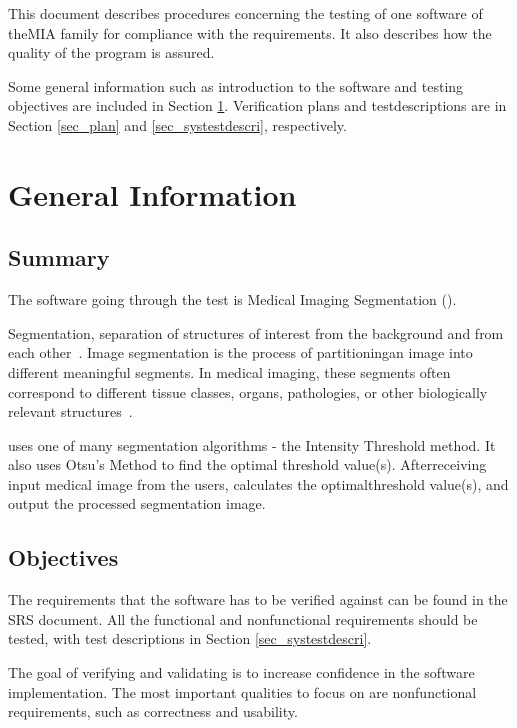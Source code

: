 \documentclass[12pt, titlepage]{article}
\begin{document}
\newpage


This document describes procedures concerning the testing of one software of
theMIA family for compliance with the requirements. It also describes how the
quality of the program is assured.

Some general information such as introduction to the software and testing
objectives are included in Section \ref{sec_geinfo}. Verification plans and
testdescriptions are in Section \ref{sec_plan} and \ref{sec_systestdescri},
respectively.

\section{General Information} \label{sec_geinfo}

\subsection{Summary}

The software going through the test is Medical Imaging Segmentation
(\progname{}).

Segmentation, separation of structures of interest from the background and from
each other~\cite{Bankman2000}. Image segmentation is the process of
partitioningan image into different meaningful segments. In medical imaging,
these segments
often correspond to different tissue classes, organs, pathologies, or other
biologically relevant structures~\cite{Forouzanfar2010}.

\progname{} uses one of many segmentation algorithms - the Intensity Threshold
method. It also uses Otsu's Method to find the optimal threshold value(s).
Afterreceiving input medical image from the users, \progname{} calculates the
optimalthreshold value(s), and output the processed segmentation image.

\subsection{Objectives}
\label{Sec_objectives}
The requirements that the software has to be verified against can be found in
the SRS document. All the functional and nonfunctional requirements should be
tested, with test descriptions in Section \ref{sec_systestdescri}.

The goal of verifying and validating is to increase confidence in the software
implementation. The most important qualities to focus on are nonfunctional
requirements, such as correctness and usability.
\end{document}
